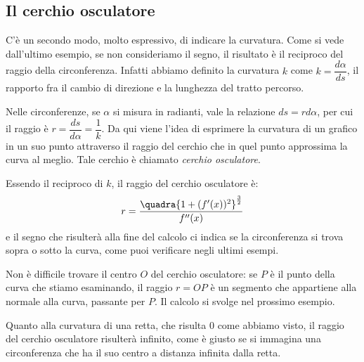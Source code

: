 
\subsection{Il cerchio osculatore}
C'è un secondo modo, molto espressivo, di indicare la curvatura. Come si vede 
dall'ultimo esempio, se non consideriamo il segno, il risultato è il reciproco 
del raggio della circonferenza. Infatti abbiamo definito la curvatura \(k\) 
come \(k=\dfrac{d\alpha}{ds}\), il rapporto fra il cambio di direzione e la 
lunghezza del tratto percorso.

Nelle circonferenze, se \(\alpha\) si misura in radianti, vale la relazione 
\(ds=rd\alpha\), per cui il raggio è \(r=\dfrac{ds}{d\alpha}=\dfrac{1}{k}\). Da 
qui viene l'idea di esprimere la curvatura di un grafico in un suo punto 
attraverso il raggio del cerchio che in quel punto approssima la curva al 
meglio. Tale cerchio è chiamato \emph{cerchio osculatore}.

Essendo il reciproco di \(k\), il raggio del cerchio osculatore è:
\[
 r=\dfrac{\quadra{1+(f'(x))^2}^{\frac{3}{2}}}{f''(x)}
\]
e il segno che risulterà alla fine del calcolo ci indica se la circonferenza si 
trova sopra o sotto la curva, come puoi verificare negli ultimi esempi.

Non è difficile trovare il centro \(O\) del cerchio osculatore: 
se \(P\) è il punto della curva che stiamo esaminando, il raggio \(r=OP\) è un 
segmento che appartiene alla normale alla curva, passante per \(P\). Il calcolo 
si svolge nel prossimo esempio.

Quanto alla curvatura di una retta, che risulta \(0\) come abbiamo visto, il 
raggio del cerchio osculatore risulterà infinito, come è giusto se si 
immagina una circonferenza che ha il suo centro a distanza infinita dalla 
retta.

